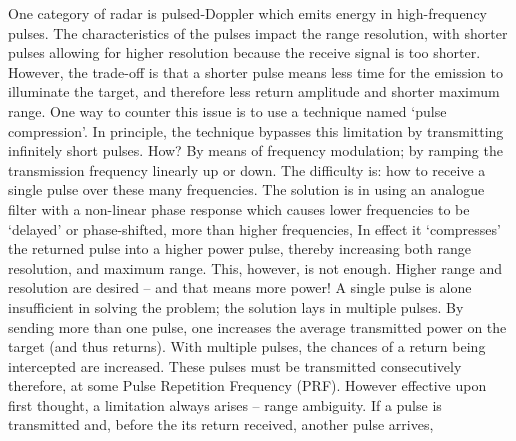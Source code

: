 One category of radar is pulsed-Doppler which emits energy in high-frequency pulses. The characteristics of the pulses impact the range resolution, with shorter pulses allowing for higher resolution because the receive signal is too shorter. However, the trade-off is that a shorter pulse means less time for the emission to illuminate the target, and therefore less return amplitude and shorter maximum range. One way to counter this issue is to use a technique named ‘pulse compression’. In principle, the technique bypasses this limitation by transmitting infinitely short pulses. How? By means of frequency modulation; by ramping the transmission frequency linearly up or down. The difficulty is: how to receive a single pulse over these many frequencies. The solution is in using an analogue filter with a non-linear phase response which causes lower frequencies to be ‘delayed’ or phase-shifted, more than higher frequencies, In effect it ‘compresses’ the returned pulse into a higher power pulse, thereby increasing both range resolution, and maximum range. This, however, is not enough. Higher range and resolution are desired – and that means more power! A single pulse is alone insufficient in solving the problem; the solution lays in multiple pulses. By sending more than one pulse, one increases the average transmitted power on the target (and thus returns). With multiple pulses, the chances of a return being intercepted are increased. These pulses must be transmitted consecutively therefore, at some Pulse Repetition Frequency (PRF). However effective upon first thought, a limitation always arises – range ambiguity. If a pulse is transmitted and, before the its return received, another pulse arrives,  \cite{parker_chapter_2010}



